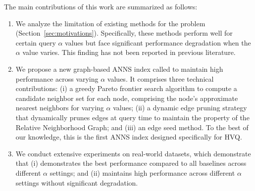 



The main contributions of this work are summarized as follows:

\begin{enumerate}[leftmargin=*,topsep=0pt]
\item We 
analyze 
the limitation of existing methods for the \hvq problem (Section~\ref{sec:motivations}). Specifically, these methods perform well for certain query $\alpha$ values but face significant performance degradation when the {\cheng $\alpha$ value} varies. 
This finding
has not been reported in previous literature. 


\item We propose a new graph-based ANNS index called \method to maintain high performance across varying {\cheng $\alpha$ values}. It comprises three technical contributions: (i) a greedy Pareto frontier search algorithm to compute a candidate neighbor set for each node, comprising the node’s approximate nearest neighbors for varying $\alpha$ values; (ii) a dynamic edge pruning strategy that dynamically prunes edges at query time to maintain the property of the Relative Neighborhood Graph; and (iii) an 
edge seed method. To the best of our knowledge, this is the first ANNS index designed specifically for HVQ. %



\item We conduct extensive experiments on real-world datasets, which demonstrate that (i) \method demonstrates the best performance compared to all baselines across different $\alpha$ settings; {\cheng and} (ii) \method maintains high performance across different $\alpha$ settings without significant degradation. 

\end{enumerate}

